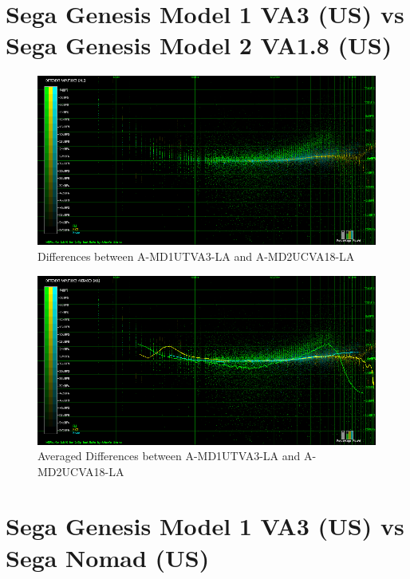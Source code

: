 \documentclass[10pt,a4paper]{report}
\begin{document}
\section{Sega Genesis Model 1 VA3 (US) vs\\ Sega Genesis Model 2 VA1.8 (US)}

\begin{figure}[H]
	\centering
	\includegraphics[width=1.0\linewidth]{images/results/5-1-A-MD1UTVA3-LA_vs_A-MD2UCVA18_LA.png}
	\caption[A-MD1UTVA3-LA vs A-MD2UCVA18-LA]{Differences between A-MD1UTVA3-LA and A-MD2UCVA18-LA}
	\label{fig:A-MD1UTVA3-LA_vs_A-MD2UCVA18_LA}
\end{figure}

\begin{figure}[H]
	\centering
	\includegraphics[width=1.0\linewidth]{images/results/5-2-A-MD1UTVA3-LA_vs_A-MD2UCVA18_LA.png}
	\caption[A-MD1UTVA3-LA vs A-MD2UCVA18-LA Averaged]{Averaged Differences between A-MD1UTVA3-LA and A-MD2UCVA18-LA}
	\label{fig:A-MD1UTVA3-LA_vs_A-MD2UCVA18_LA_AVG}
\end{figure}

\section{Sega Genesis Model 1 VA3 (US) vs\\ Sega Nomad (US)}
\end{document}
